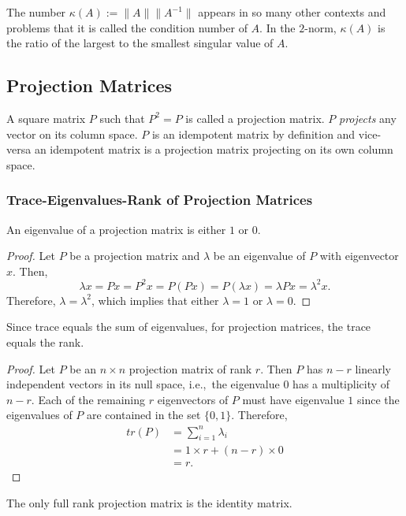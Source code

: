 \documentclass{amsart}
\theoremstyle{plain}
\numberwithin{equation}{section}
\begin{document}
The number $\kappa(A) := \|A\| \|A^{-1}\|$ appears in so many other 
contexts and problems that it is called the condition number of $A$.
In the $2$-norm, $\kappa(A)$ is the ratio of the largest to the smallest
singular value of $A$.

\subsection*{Projection Matrices}
A square matrix $P$ such that $P^2=P$ is called
a projection matrix. $P$ \emph{projects} any 
vector on its column space. $P$ is an idempotent
matrix by definition and vice-versa an 
idempotent matrix is a projection matrix
projecting on its own column space.

\subsubsection*{Trace-Eigenvalues-Rank of Projection Matrices}
An eigenvalue of a projection matrix is 
either $1$ or $0$. 

\begin{proof}
Let $P$ be a projection matrix and
$\lambda$ be an eigenvalue of $P$
with eigenvector $x$. Then,
\begin{equation}
\lambda x = P x= P^2x = P (Px) = P(\lambda x) = \lambda P x = \lambda^2 x.
\end{equation}
Therefore, $\lambda = \lambda^2$, which implies that either $\lambda = 1$ or 
$\lambda = 0$. 
\end{proof}

Since trace equals the sum of eigenvalues, for projection matrices, the trace equals
the rank. 

\begin{proof}
Let $P$ be an $n \times n$ projection matrix of rank $r$. Then
$P$ has $n-r$ linearly independent vectors in its null space, i.e.,\
the eigenvalue $0$ has a multiplicity of $n-r$. Each of the remaining
$r$ eigenvectors of $P$ must have eigenvalue $1$ since the eigenvalues 
of $P$ are contained in the set $\{0, 1\}$. Therefore,  
\begin{align*}
tr(P) &= \sum_{i=1}^n \lambda_i \\
&= 1 \times r  + (n-r) \times 0 \\
&= r.
\end{align*}
\end{proof}

The only full rank projection matrix is the identity matrix. 
\end{document}
